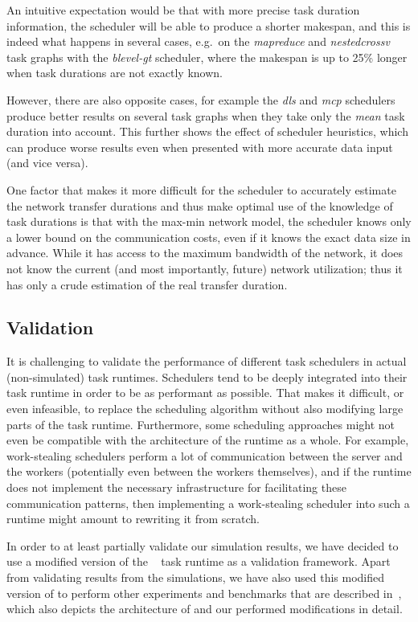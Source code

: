 An intuitive expectation would be that with more precise task duration information, the scheduler
will be able to produce a shorter makespan, and this is indeed what happens in several cases, e.g.\
on the \emph{mapreduce} and \emph{nestedcrossv} task graphs with the
\emph{blevel-gt} scheduler, where the makespan is up to 25\% longer when task durations are
not exactly known.

However, there are also opposite cases, for example the \emph{dls} and
\emph{mcp} schedulers produce better results on several task graphs when they take
only the \emph{mean} task duration into account. This further shows the effect of
scheduler heuristics, which can produce worse results even when presented with more accurate data
input (and vice versa).

One factor that makes it more difficult for the scheduler to accurately estimate the network
transfer durations and thus make optimal use of the knowledge of task durations is that with the
max-min network model, the scheduler knows only a lower bound on the communication costs, even if
it knows the exact data size in advance. While it has access to the maximum bandwidth of the
network, it does not know the current (and most importantly, future) network utilization; thus it
has only a crude estimation of the real transfer duration.

\subsection{Validation}
It is challenging to validate the performance of different task schedulers in actual
(non-simulated) task runtimes. Schedulers tend to be deeply integrated into their task runtime in
order to be as performant as possible. That makes it difficult, or even infeasible, to replace the
scheduling algorithm without also modifying large parts of the task runtime. Furthermore, some
scheduling approaches might not even be compatible with the architecture of the runtime as a whole.
For example, work-stealing schedulers perform a lot of communication between the server and the
workers (potentially even between the workers themselves), and if the runtime does not implement
the necessary infrastructure for facilitating these communication patterns, then implementing a
work-stealing scheduler into such a runtime might amount to rewriting it from scratch.

In order to at least partially validate our simulation results, we have decided to use a modified
version of the \dask{}~\cite{dask} task runtime as a validation
framework. Apart from validating results from the \estee{} simulations, we have also
used this modified version of \dask{} to perform other experiments and benchmarks
that are described in~\Autoref{ch:rsds}, which also depicts the architecture of
\dask{} and our performed modifications in detail.

